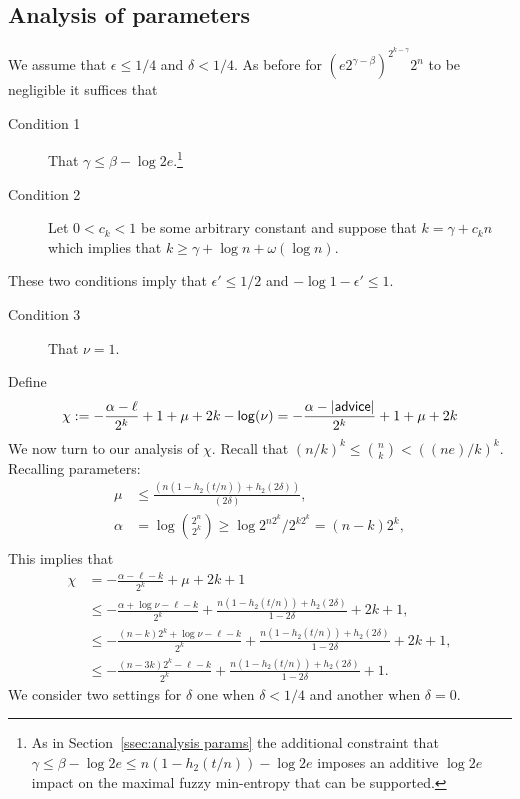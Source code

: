 \subsection{Analysis of parameters}
We assume that $\epsilon\le 1/4$ and $\delta<1/4$.  As before for  
$
\left(e2^{\gamma-\beta}\right)^{2^{k-\gamma}}2^n$ to be negligible it suffices that
\begin{description}
\item[Condition 1] That $\gamma \le \beta-\log{2e}.$\footnote{As in Section~\ref{ssec:analysis params} the additional constraint that 
$
\gamma \le \beta - \log{2e}
\le n(1-h_2(t/n)) - \log{2e}$ imposes an additive $\log{2e}$ impact on the maximal fuzzy min-entropy that can be supported. 
}
\item[Condition 2] Let $0<c_k<1$ be some arbitrary constant and suppose that $k= \gamma+c_kn$ which implies that $k\ge \gamma + \log{n+\omega(\log{n})}$.
\end{description}
These two conditions imply that $\epsilon'\le 1/2$ and $-\log{1-\epsilon'}\le 1$.
\begin{description}
\item[Condition 3] That  $\nu = 1$.
\end{description}
Define \[\chi: =-\frac{\alpha-\ell}{2^k}+1+\mu+2k-\mathsf{log}\!\left(\nu\right)=-\frac{\alpha-|{\mathsf{advice}}|}{2^k}+1+\mu+2k\]
We now turn to our analysis of $\chi$.  Recall that $(n/k)^k \le {n\choose k} < ((ne)/k)^k$.  Recalling parameters: 
\begin{align*}
\mu&\le \frac{(n(1-h_2(t/n)) +h_2(2\delta))}{(2\delta)},\\
\alpha &= \log{2^n\choose 2^k} \ge \log{2^{n2^k} /2^{k2^k}} = (n-k)2^k,\\
\end{align*}
This implies that 
\begin{align*}
\chi&= -\frac{\alpha-\ell-k}{2^k} + \mu +2k+1\\
&\le  -\frac{\alpha +\log{\nu}-\ell-k}{2^k} +\frac{n(1-h_2(t/n)) +h_2(2\delta)}{1-2\delta}  + 2k+1,\\
&\le - \frac{(n-k)2^k +\log{\nu}-\ell-k}{2^k} +\frac{n(1-h_2(t/n)) +h_2(2\delta)}{1-2\delta} + 2k+1,\\
&\le  -\frac{(n-3k)2^k-\ell-k}{2^k} + \frac{n(1-h_2(t/n)) +h_2(2\delta)}{1-2\delta}+1.
\end{align*}
We consider two settings for $\delta$ one when $\delta<1/4$ and another when $\delta=0$.

